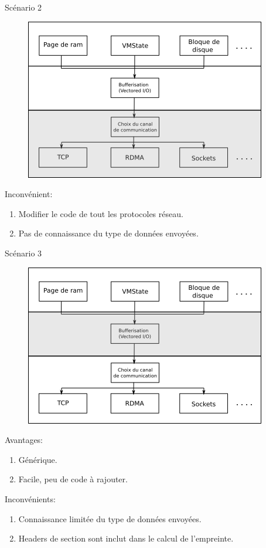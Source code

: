 \documentclass{libs/XJTLU_format}
\begin{document}
\begin{frame}{Scénario 2}
    \begin{figure}
        \centering
        \includegraphics[scale=0.5]{images/idea4.png}
    \end{figure}
    Inconvénient:
        \begin{enumerate}
            \item Modifier le code de tout les protocoles réseau.
            \item Pas de connaissance du type de données envoyées.
        \end{enumerate}
\end{frame}

\begin{frame}{Scénario 3}
    \begin{figure}
        \centering
        \includegraphics[scale=0.5]{images/idea3.png}
    \end{figure}
    Avantages:
        \begin{enumerate}
            \item Générique.
            \item Facile, peu de code à rajouter.
        \end{enumerate}
    Inconvénients:
        \begin{enumerate}
            \item Connaissance limitée du type de données envoyées.
            \item Headers de section sont inclut dans le calcul de l'empreinte.
        \end{enumerate}
\end{frame}
\end{document}
